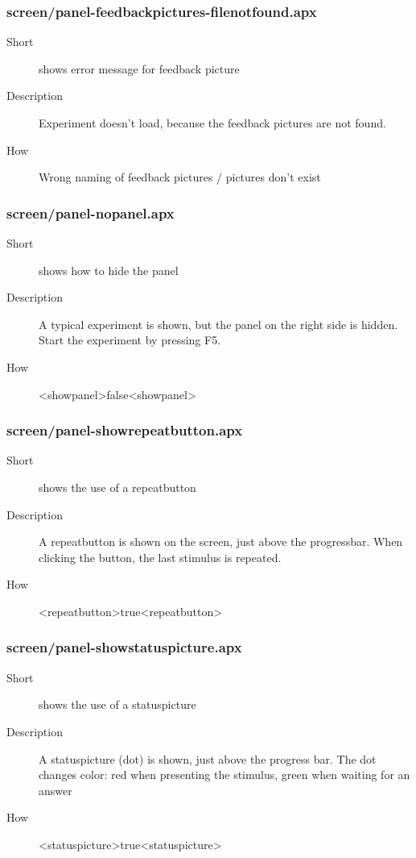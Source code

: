 \subsubsection{screen/panel-feedbackpictures-filenotfound.apx}
\begin{description}
\item[Short] 
 shows error message for feedback picture
\item[Description] 
 Experiment doesn't load, because the feedback pictures are not found.
\item[How] 
 Wrong naming of feedback pictures / pictures don't exist
\end{description}

\subsubsection{screen/panel-nopanel.apx}
\begin{description}
\item[Short] 
 shows how to hide the panel
\item[Description] 
 A typical experiment is shown, but the panel on the right side is hidden. Start the experiment by pressing F5.
\item[How] 
 \textless{}showpanel\textgreater{}false\textless{}showpanel\textgreater{}
\end{description}

\subsubsection{screen/panel-showrepeatbutton.apx}
\begin{description}
\item[Short] 
 shows the use of a repeatbutton
\item[Description] 
 A repeatbutton is shown on the screen, just above the progressbar. When clicking the button, the last stimulus is repeated.
\item[How] 
 \textless{}repeatbutton\textgreater{}true\textless{}repeatbutton\textgreater{}
\end{description}

\subsubsection{screen/panel-showstatuspicture.apx}
\begin{description}
\item[Short] 
 shows the use of a statuspicture
\item[Description] 
 A statuspicture (dot) is shown, just above the progress bar. The dot changes color: red when presenting the stimulus, green when waiting for an answer
\item[How] 
 \textless{}statuspicture\textgreater{}true\textless{}statuspicture\textgreater{}
\end{description}

